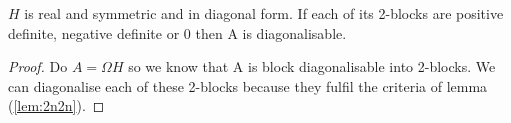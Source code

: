 \begin{lemma} $H$ is real and symmetric and in diagonal form. If each of its 2-blocks are positive definite, negative definite or 0 then A is diagonalisable. \label{lem:adiag} \end{lemma}
\begin{proof}
Do $A = \Omega H$ so we know that A is block diagonalisable into 2-blocks. We can diagonalise each of these 2-blocks because they fulfil the criteria of lemma (\ref{lem:2n2n}).
\end{proof}